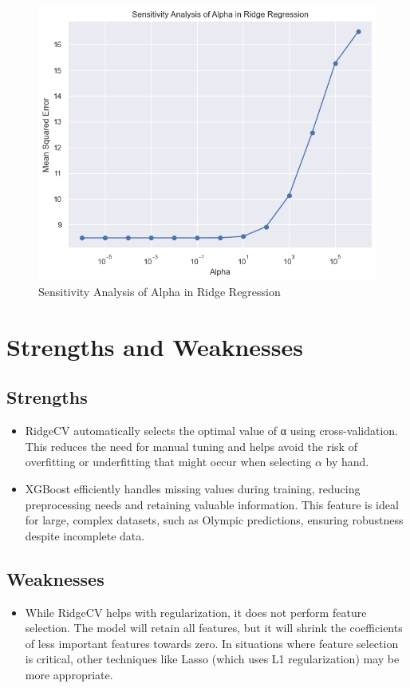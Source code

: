 \documentclass[12pt]{article}  %
\begin{document}
\begin{figure}[H]
    \centering
    \includegraphics[width=0.5\linewidth]{sensitivity.png}
    \caption{Sensitivity Analysis of Alpha in Ridge Regression}
    \label{fig:enter-label}
\end{figure}



\section{Strengths and Weaknesses}
\subsection{Strengths}
\begin{itemize}
    \item RidgeCV automatically selects the optimal value of α using cross-validation. This reduces the need for manual tuning and helps avoid the risk of overfitting or underfitting that might occur when selecting $\alpha$ by hand.
    \item XGBoost efficiently handles missing values during training, reducing preprocessing needs and retaining valuable information. This feature is ideal for large, complex datasets, such as Olympic predictions, ensuring robustness despite incomplete data.


\end{itemize}



\subsection{Weaknesses}
\begin{itemize}
    \item While RidgeCV helps with regularization, it does not perform feature selection. The model will retain all features, but it will shrink the coefficients of less important features towards zero. In situations where feature selection is critical, other techniques like Lasso (which uses L1 regularization) may be more appropriate.
\end{itemize}
\end{document}
